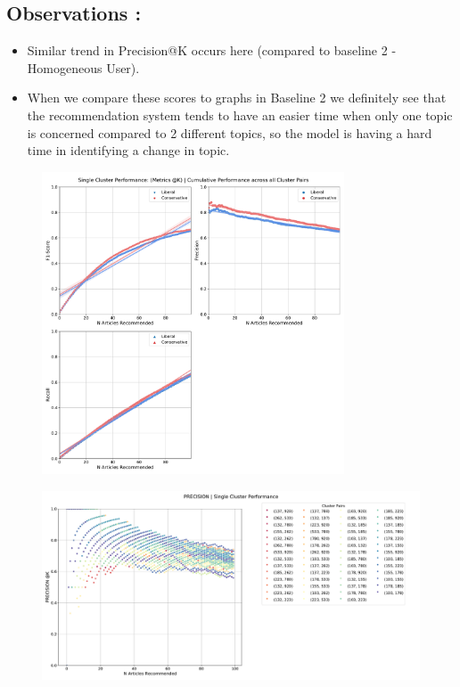 \documentclass[a4paper,fontsize=9.0pt]{scrartcl}
\begin{document}
\subsection{Observations :}
\begin{flushleft}
\begin{itemize}
    \item Similar trend in Precision@K occurs here (compared to baseline 2 - Homogeneous User). 
    \item  When we compare these scores to graphs in Baseline 2 we definitely see that the recommendation system tends to have an easier time when only one topic is concerned compared to 2 different topics, so the model is having a hard time in identifying a change in topic.
\end{itemize}
\end{flushleft}
\begin{figure}[H]
 \includegraphics[width=0.8\textwidth]{Graphs/user_interaction_vs_model_performance_cumu_single_cluster.pdf}
\end{figure}
\begin{figure}[H]
 \includegraphics[width=1.0\textwidth]{Graphs/user_interaction_vs_model_performance_precision_all_cps_single_cluster.pdf}
\end{figure}
\end{document}
